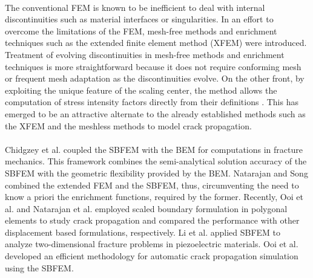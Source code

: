 \paragraph{}
The conventional FEM is known to be inefficient to deal with internal discontinuities such as material interfaces or singularities.
In an effort to overcome the limitations of the FEM, mesh-free methods and enrichment techniques such as the extended finite element method (XFEM) were introduced.
Treatment of evolving discontinuities in mesh-free methods \cite{doi:10.1002/nme.1151,Rabczuk2007} and enrichment techniques \cite{Babuška20031,doi:10.1002/nme.1966,CHAUDINH2012242,AREIAS2013113} is more straightforward because it does not require conforming mesh or frequent mesh adaptation as the discontinuities evolve.
On the other front, by exploiting the unique feature of the scaling center, the method allows the computation of stress intensity factors directly from their definitions \cite{Dee2005,SONG2002183}.
This has emerged to be an attractive alternate to the already established methods such as the XFEM and the meshless methods to model crack propagation.

\paragraph{}
Chidgzey et al. \cite{CHIDGZEY20081198,BIRD2010599} coupled the SBFEM with the BEM for computations in fracture mechanics.
This framework combines the semi-analytical solution accuracy of the SBFEM with the geometric flexibility provided by the BEM.
Natarajan and Song \cite{doi:10.1002/nme.4557} combined the extended FEM and the SBFEM, thus, circumventing the need to know a priori the enrichment functions, required by the former.
Recently, Ooi et al. \cite{doi:10.1002/nme.4284} and Natarajan et al.\cite{NATARAJAN2014101} employed scaled boundary formulation in polygonal elements to study crack propagation and compared the performance with other displacement based formulations, respectively.
Li et al.\cite{LI201352} applied SBFEM to analyze two-dimensional fracture problems in piezoelectric materials.
Ooi et al.\cite{doi:10.1002/nme.4284,OOI20101178,OOI20131} developed an efficient methodology for automatic crack propagation simulation using the SBFEM.

